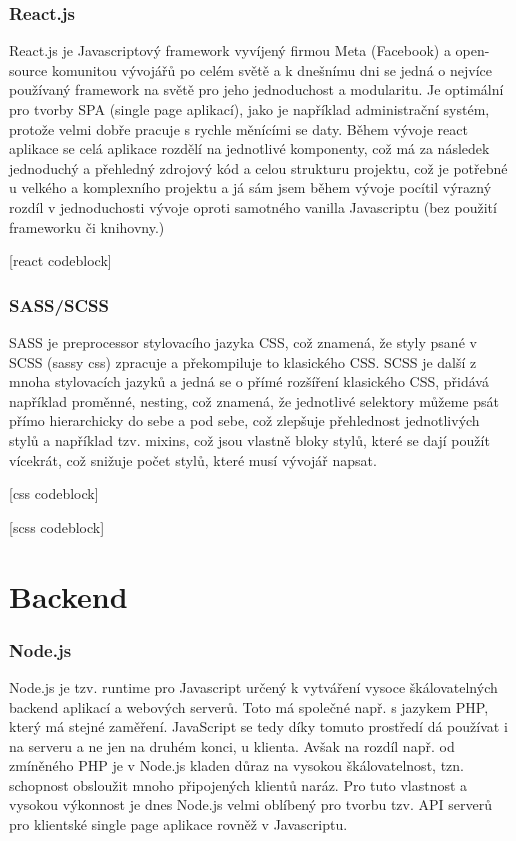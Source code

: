 \documentclass[12pt,a4paper]{report}
\begin{document}
  \subsubsection{React.js}
  React.js je Javascriptový framework vyvíjený firmou Meta (Facebook) a open-source komunitou
  vývojářů po celém světě a k dnešnímu dni se jedná o nejvíce používaný framework na světě pro
  jeho jednoduchost a modularitu.
  Je optimální pro tvorby SPA (single page aplikací), jako je například administrační systém, protože
  velmi dobře pracuje s rychle měnícími se daty. Během vývoje react aplikace se celá aplikace
  rozdělí na jednotlivé komponenty, což má za následek jednoduchý a přehledný zdrojový kód a
  celou strukturu projektu, což je potřebné u velkého a komplexního projektu a já sám jsem během
  vývoje pocítil výrazný rozdíl v jednoduchosti vývoje oproti samotného vanilla Javascriptu (bez
  použití frameworku či knihovny.)

  [react codeblock]
  \subsubsection{SASS/SCSS}
  SASS je preprocessor stylovacího jazyka CSS, což znamená, že styly psané v SCSS (sassy css)
  zpracuje a překompiluje to klasického CSS.
  SCSS je další z mnoha stylovacích jazyků a jedná se o přímé rozšíření klasického CSS, přidává
  například proměnné, nesting, což znamená, že jednotlivé selektory můžeme psát přímo
  hierarchicky do sebe a pod sebe, což zlepšuje přehlednost jednotlivých stylů a například tzv.
  mixins, což jsou vlastně bloky stylů, které se dají použít vícekrát, což snižuje počet stylů, které musí
  vývojář napsat.

  [css codeblock]

  [scss codeblock]
  \section{Backend}
  \subsubsection{Node.js}
  Node.js je tzv. runtime pro Javascript určený k vytváření vysoce škálovatelných backend aplikací a
  webových serverů. Toto má společné např. s jazykem PHP, který má stejné zaměření. JavaScript se
  tedy díky tomuto prostředí dá používat i na serveru a ne jen na druhém konci, u klienta. Avšak na
  rozdíl např. od zmíněného PHP je v Node.js kladen důraz na vysokou škálovatelnost, tzn.
  schopnost obsloužit mnoho připojených klientů naráz. Pro tuto vlastnost a vysokou výkonnost je
  dnes Node.js velmi oblíbený pro tvorbu tzv. API serverů pro klientské single page aplikace rovněž v
  Javascriptu. 
\end{document}
